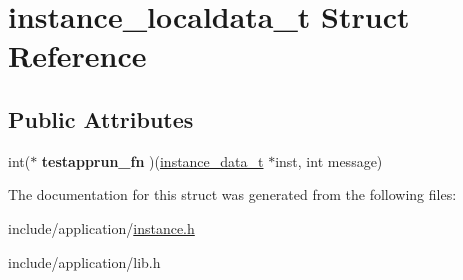 \hypertarget{structinstance__localdata__t}{\section{instance\-\_\-localdata\-\_\-t Struct Reference}
\label{structinstance__localdata__t}
}
\subsection*{Public Attributes}
\begin{DoxyCompactItemize}
\item 
\hypertarget{structinstance__localdata__t_a04ff27a07ee6f8b804dcf3359b11bf73}{int($\ast$ {\bfseries testapprun\-\_\-fn} )(\hyperlink{structinstance__data__t}{instance\-\_\-data\-\_\-t} $\ast$inst, int message)}\label{structinstance__localdata__t_a04ff27a07ee6f8b804dcf3359b11bf73}

\end{DoxyCompactItemize}


The documentation for this struct was generated from the following files\-:\begin{DoxyCompactItemize}
\item 
include/application/\hyperlink{instance_8h}{instance.\-h}\item 
include/application/lib.\-h\end{DoxyCompactItemize}
